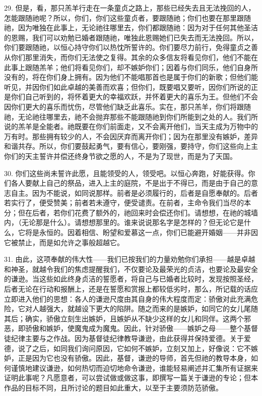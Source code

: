 29. 但是，看，那只羔羊行走在一条童贞之路上，那些已经失去且无法挽回的人，怎能跟随祂呢？所以，你们，你们这些童贞者，要跟随祂；你们也要在那里跟随祂，因为唯独在此事上，无论祂往哪里去，你们都跟随祂：因为对于任何其他圣洁的恩赐，我们可以劝勉已婚者跟随祂，唯独此恩赐她们已失去而无法挽回。所以，你们要跟随祂，以恒心持守你们以热忱所誓许的。你们要尽力前行，免得童贞之善从你们那里消失，而你们无法使之复得。其余的众多信友将看见你们，他们不能在此事上跟随羔羊；他们将看见你们，却不嫉妒你们；因着与你们同乐，他们自身所没有的，将在你们身上拥有。因为他们不能唱那首也是属于你们的新歌；但他们能听见，并因你们如此卓越的美善而欢喜；但你们，既要唱又要听，因你们所说的正是你们自己听到的，将怀着更大的幸福欢跃，并怀着更大的喜乐为王。但他们不会因你们更大的喜乐而忧伤，尽管他们缺乏此喜乐。实在，那只羔羊，你们将跟随祂，无论祂往哪里去，祂不会抛弃那些不能跟随祂到你们所能到之处的人。我们所说的羔羊是全能者。祂既要在你们前面走，又不会离开他们，当天主成为万物中的万有时。那些拥有较少的人，不会因厌弃而离开你们；因为在那里没有嫉妒，差异和谐共存。所以，你们要鼓起勇气，要有信心，要刚强，要持守，你们这些向上主你们的天主誓许并偿还终身节欲之愿的人，不是为了现世，而是为了天国。\par

30. 你们这些尚未誓许此愿，且能领受的人，领受吧。以恒心奔跑，好能获得。你们各人要献上自己的祭品，进入上主的庭院，不是出于不得已，而是由于自己的意志自主。因为不能说，如同说那样。前者是必须履行的，后者是自愿奉献的。后者若实行了，便受赞美；前者若未遵守，便受谴责。在前者，主命令我们当尽的本分；但在后者，若你们花费了额外的，祂回来时会偿还你们。请想想，在祂的城墙内，（无论那是什么）。请想想那里的。谁来说说那名字是怎样的？但无论它是什么，它将是永恒的。因着相信、盼望和爱慕这一点，你们已能避开婚姻——并非因它被禁止，而是如允许之事般超越它。\par

31. 由此，这项奉献的伟大性——我们已按我们的力量劝勉你们承担——越是卓越和神圣，就越令我们的焦虑提醒我们，不仅要论及最荣光的贞洁，也要论及最安全的谦逊。当这些如此终身贞洁的誓愿者，将自己与已婚者比较时，发现按照圣经，后者无论在行动和报酬上，还是在誓愿和赏报上都较低劣时，那么，所记载的话应立即进入他们的思想：各人的谦逊尺度由其自身的伟大程度而定：骄傲对此充满危险，它对人越强大，就越设下更大的陷阱。随之而来的是嫉妒，如同它的女儿尾随其后；确实，骄傲立刻生出嫉妒，且嫉妒从不缺少这样的女儿和同伴。这两个邪恶，即骄傲和嫉妒，使魔鬼成为魔鬼。因此，针对骄傲——嫉妒之母——整个基督徒纪律主要与之作战。因为基督徒纪律教导谦逊，由此获得并保持爱德。关于爱德，说了之后，如同我们询问原因，它如何不嫉妒，立刻又加上，好像说：它不嫉妒，正是因为它也没有骄傲。因此，基督，谦逊的导师，首先但祂的教导本身，如何谨慎地建议谦逊，如何热切而迫切地命令谦逊，谁能轻易阐述并汇集所有证据来证明此事呢？凡愿意者，可以尝试做或做这事，即撰写一篇关于谦逊的专论；但本作品的目标不同，且所讨论的题目如此重大，以至于主要须防范骄傲。\par

